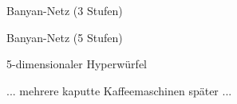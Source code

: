 \documentclass{beamer}
\begin{document}

		\begin{frame}[containsverbatim]{Banyan-Netz (3 Stufen)}
		\end{frame}


		\begin{frame}[containsverbatim]{Banyan-Netz (5 Stufen)}
		\end{frame}


		\begin{frame}[containsverbatim]{5-dimensionaler Hyperwürfel}
		\end{frame}


		\begin{frame}[containsverbatim]{}
			\begin{center}
				... mehrere kaputte Kaffeemaschinen später ...
			\end{center}
		\end{frame}

\end{document}
